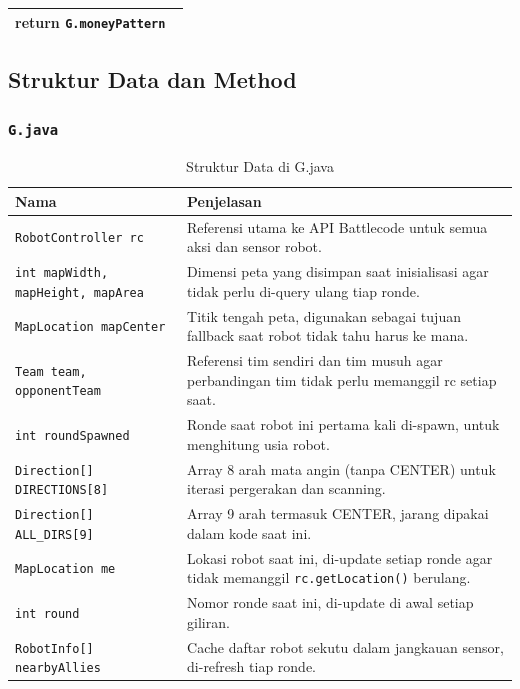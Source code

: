 \documentclass{article}
\newenvironment{pseudobox}
{
\centering
\begin{longtable}{|p{0.94\linewidth}|}
\hline
}
{
\\ \hline
\end{longtable}
\vspace{0.05cm}
}
\begin{document}
\begin{enumerate}[label=\alph*.]
\begin{enumerate}[label=\alph*.]
\begin{pseudobox}
\hspace*{1.5em}return \texttt{G.moneyPattern}
\end{pseudobox}

\end{enumerate}


\subsection{Struktur Data dan Method}

\subsubsection{\lstinline|G.java|}

\begin{longtable}{|p{}|p{}|}
\caption{Struktur Data di G.java} \\
\hline
\textbf{Nama} & \textbf{Penjelasan} \\
\hline
\endhead
\hline
\endfoot
\texttt{RobotController rc} & Referensi utama ke API Battlecode untuk semua aksi dan sensor robot. \\
\hline
\texttt{int mapWidth, mapHeight, mapArea} & Dimensi peta yang disimpan saat inisialisasi agar tidak perlu di-query ulang tiap ronde. \\
\hline
\texttt{MapLocation mapCenter} & Titik tengah peta, digunakan sebagai tujuan fallback saat robot tidak tahu harus ke mana. \\
\hline
\texttt{Team team, opponentTeam} & Referensi tim sendiri dan tim musuh agar perbandingan tim tidak perlu memanggil rc setiap saat. \\
\hline
\texttt{int roundSpawned} & Ronde saat robot ini pertama kali di-spawn, untuk menghitung usia robot. \\
\hline
\texttt{Direction[] DIRECTIONS[8]} & Array 8 arah mata angin (tanpa CENTER) untuk iterasi pergerakan dan scanning. \\
\hline
\texttt{Direction[] ALL\_DIRS[9]} & Array 9 arah termasuk CENTER, jarang dipakai dalam kode saat ini. \\
\hline
\texttt{MapLocation me} & Lokasi robot saat ini, di-update setiap ronde agar tidak memanggil \texttt{rc.getLocation()} berulang. \\
\hline
\texttt{int round} & Nomor ronde saat ini, di-update di awal setiap giliran. \\
\hline
\texttt{RobotInfo[] nearbyAllies} & Cache daftar robot sekutu dalam jangkauan sensor, di-refresh tiap ronde. \\

\end{longtable}
\end{enumerate}
\end{document}
